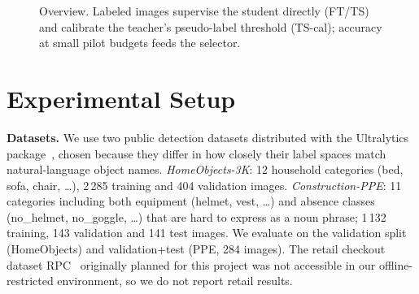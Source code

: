 \begin{figure}[t]
\centering
{}
\caption{Overview. Labeled images supervise the student directly (FT/TS) and calibrate the teacher's pseudo-label threshold (TS-cal); accuracy at small pilot budgets feeds the selector.}
\label{fig:overview}
\end{figure}

\section{Experimental Setup}
\textbf{Datasets.} We use two public detection datasets distributed with the Ultralytics package~\cite{ultralyticsdatasets}, chosen because they differ in how closely their label spaces match natural-language object names. \emph{HomeObjects-3K}: 12 household categories (bed, sofa, chair, \dots), 2\,285 training and 404 validation images. \emph{Construction-PPE}: 11 categories including both equipment (helmet, vest, \dots) and absence classes (no\_helmet, no\_goggle, \dots) that are hard to express as a noun phrase; 1\,132 training, 143 validation and 141 test images. We evaluate on the validation split (HomeObjects) and validation+test (PPE, 284 images). The retail checkout dataset RPC~\cite{wei2019rpc} originally planned for this project was not accessible in our offline-restricted environment, so we do not report retail results.

